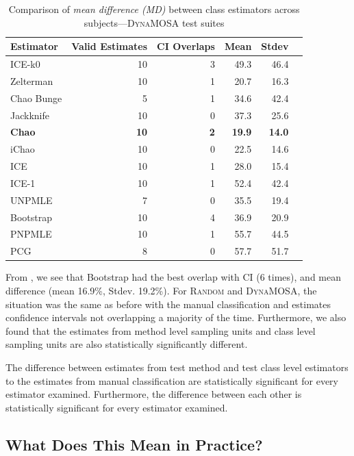 \documentclass[sigconf,review,anonymous]{acmart}
\newcommand{\ICEallrare}{ICE-k0\xspace}
\newcommand{\Zelterman}{Zelterman\xspace}
\newcommand{\ChaoBunge}{Chao Bunge\xspace}
\newcommand{\Jackknife}{Jackknife\xspace}
\newcommand{\Chao}{Chao\xspace}
\newcommand{\improvedChao}{iChao\xspace}
\newcommand{\ICE}{ICE\xspace}
\newcommand{\improvedICE}{ICE-1\xspace}
\newcommand{\Unpmle}{UNPMLE\xspace}
\newcommand{\Bootstrap}{Bootstrap\xspace}
\newcommand{\Pnpmle}{PNPMLE\xspace}
\newcommand{\PCG}{PCG\xspace}
\newcommand{\EvosuiteRandom}{\textsc{Random}\xspace}
\newcommand{\EvosuiteDynamosa}{\textsc{DynaMOSA}\xspace}
\newcommand{\B}[1]{\textbf{#1}}
\begin{document}
%
\begin{table}[t]
\caption{Comparison of \emph{mean difference (MD)} between class
estimators across subjects---\EvosuiteDynamosa test suites}
\begin{tabular}{|l|r|r|r|r|r|}
\hline
Estimator	&Valid Estimates	&CI Overlaps	&Mean	&Stdev	\\
\hline
\ICEallrare	&	10	&	3	&49.3	&	46.4\\
\Zelterman	&	10	&	1	&20.7	&	16.3\\
\ChaoBunge	&	5	&	1	&34.6	&	42.4\\
\Jackknife	&	10	&	0	&37.3	&	25.6\\
\B{\Chao}	&	\B{10}	&	\B{2}	&\B{19.9}	&	\B{14.0}\\
\improvedChao	&	10	&	0	&22.5	&	14.6\\
\ICE	&	10	&	1	&28.0	&	15.4\\
\improvedICE	&	10	&	1	&52.4	&	42.4\\
\Unpmle	&	7	&	0	&35.5	&	19.4\\
\Bootstrap	&	10	&	4	&36.9	&	20.9\\
\Pnpmle	&	10	&	1	&55.7	&	44.5\\
\PCG	&	8	&	0	&57.7	&	51.7\\
\hline
\end{tabular}
\label{tbl:estdynamosaclass}
\end{table}


From , we see that Bootstrap had the best
overlap with CI (6 times), and mean difference (mean 16.9\%, Stdev. 19.2\%).
%
For \EvosuiteRandom and \EvosuiteDynamosa, the situation was the same as before
with the manual classification and estimates confidence intervals not
overlapping a majority of the time.
%
Furthermore, we also found that the estimates from method level sampling units
and class level sampling units are also statistically significantly different.

\begin{tcolorbox}[boxrule=0.5pt, arc=4pt, boxsep=0pt, width=\columnwidth]
The difference between estimates from test method and test class level
estimators to the estimates from manual classification are statistically
significant for every estimator examined. Furthermore, the difference between
each other is statistically significant for every estimator examined.
\end{tcolorbox}


\subsection{What Does This Mean in Practice?}
\end{document}
